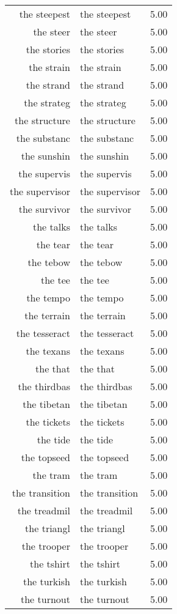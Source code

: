 \begin{table}[ht]
\begin{tabular}{rlr}
  the steepest & the steepest & 5.00 \\ 
  the steer & the steer & 5.00 \\ 
  the stories & the stories & 5.00 \\ 
  the strain & the strain & 5.00 \\ 
  the strand & the strand & 5.00 \\ 
  the strateg & the strateg & 5.00 \\ 
  the structure & the structure & 5.00 \\ 
  the substanc & the substanc & 5.00 \\ 
  the sunshin & the sunshin & 5.00 \\ 
  the supervis & the supervis & 5.00 \\ 
  the supervisor & the supervisor & 5.00 \\ 
  the survivor & the survivor & 5.00 \\ 
  the talks & the talks & 5.00 \\ 
  the tear & the tear & 5.00 \\ 
  the tebow & the tebow & 5.00 \\ 
  the tee & the tee & 5.00 \\ 
  the tempo & the tempo & 5.00 \\ 
  the terrain & the terrain & 5.00 \\ 
  the tesseract & the tesseract & 5.00 \\ 
  the texans & the texans & 5.00 \\ 
  the that & the that & 5.00 \\ 
  the thirdbas & the thirdbas & 5.00 \\ 
  the tibetan & the tibetan & 5.00 \\ 
  the tickets & the tickets & 5.00 \\ 
  the tide & the tide & 5.00 \\ 
  the topseed & the topseed & 5.00 \\ 
  the tram & the tram & 5.00 \\ 
  the transition & the transition & 5.00 \\ 
  the treadmil & the treadmil & 5.00 \\ 
  the triangl & the triangl & 5.00 \\ 
  the trooper & the trooper & 5.00 \\ 
  the tshirt & the tshirt & 5.00 \\ 
  the turkish & the turkish & 5.00 \\ 
  the turnout & the turnout & 5.00 \\ 

\end{tabular}
\end{table}
